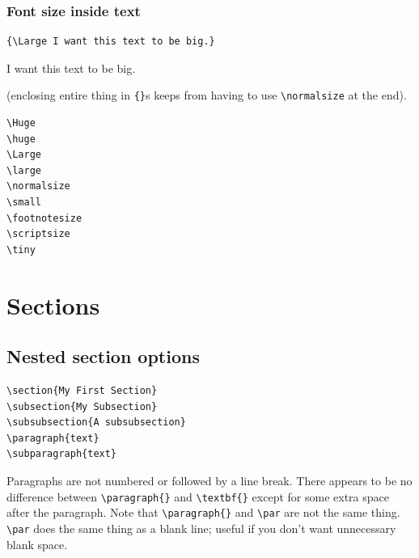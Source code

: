 \documentclass{article}
\begin{document}
\subsubsection{Font size inside text}
\begin{verbatim}
{\Large I want this text to be big.}
\end{verbatim}
{\Large I want this text to be big.}

(enclosing entire thing in \verb|{}|s keeps from having to use
\verb|\normalsize| at the end).

\begin{verbatim}
\Huge
\huge
\Large
\large
\normalsize
\small
\footnotesize
\scriptsize
\tiny
\end{verbatim}

\section{Sections}
\subsection{Nested section options}
\begin{verbatim}
\section{My First Section}
\subsection{My Subsection}
\subsubsection{A subsubsection}
\paragraph{text}
\subparagraph{text}
\end{verbatim}
Paragraphs are not numbered or followed by a line break.
There appears to be no difference between \verb|\paragraph{}|
and \verb|\textbf{}| except for some extra space after the paragraph.
Note that \verb|\paragraph{}| and \verb|\par| are not the same thing.
\verb|\par| does the same thing as a blank line; useful if you don't
want unnecessary blank space.
\end{document}
